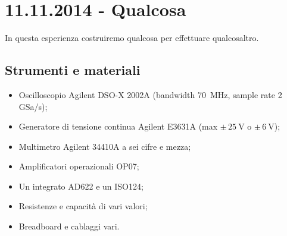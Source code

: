 \section{11.11.2014 - Qualcosa}

In questa esperienza costruiremo qualcosa per effettuare qualcosaltro.

\subsection*{Strumenti e materiali}

\begin{itemize} [noitemsep]
	\item Oscilloscopio Agilent DSO-X 2002A (bandwidth \SI{70}{\mega\hertz}, sample rate \num{2} GSa/s);%
		\item Generatore di tensione continua Agilent E3631A (max $\pm \, \SI{25}{\volt}$ o $\pm \, \SI{6}{\volt}$);
		\item Multimetro Agilent 34410A a sei cifre e mezza;
		\item Amplificatori operazionali OP07;
		\item Un integrato AD622 e un ISO124;
		\item Resistenze e capacità di vari valori;
		\item Breadboard e cablaggi vari.
\end{itemize}
